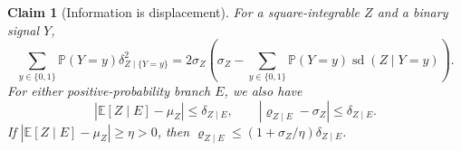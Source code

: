 \documentclass[11pt]{article}
\newtheorem{claim}[theorem]{Claim}
\newcommand{\E}[1]{\mathbb E\left[#1\right]}
\DeclareMathOperator{\sd}{sd}
\begin{document}
\begin{claim}[Information is displacement]\label{cl:trade-displacement}
For a square-integrable $Z$ and a binary signal $Y$,
\begin{equation}\label{eq:trade-displacement}
 \sum_{{y \in \{0,1\}}}\mathbb P(Y=y)\delta_{Z\mid\{Y=y\}}^2
 =2\sigma_Z\left(\sigma_Z-\sum_{{y \in \{0,1\}}}\mathbb P(Y=y)\sd(Z\mid Y=y)\right).
\end{equation}
For either positive-probability branch $E$, we also have
\begin{equation}\label{eq:trade-displacement-readings}
 |\E{Z\mid E}-\mu_Z|\le\delta_{Z\mid E},\qquad
 |\varrho_{Z\mid E}-\sigma_Z|\le\delta_{Z\mid E}.
\end{equation}
If $|\E{Z\mid E}-\mu_Z|\ge\eta>0$, then
$\varrho_{Z\mid E}\le(1+\sigma_Z/\eta)\delta_{Z\mid E}$.
\end{claim}
\end{document}
